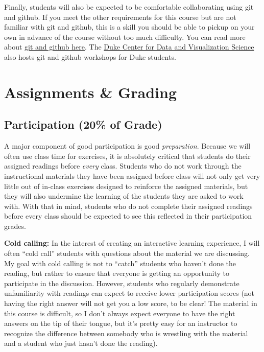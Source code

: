 \documentclass[12pt]{article}
\begin{document}
Finally, students will also be expected to be comfortable collaborating using git and github. If you meet the other requirements for this course but are not familiar with git and github, this is a skill you should be able to pickup on your own in advance of the course without too much difficulty. You can read more about \href{https://www.practicaldatascience.org/html/git_and_github.html}{git and github here}. The \href{https://library.duke.edu/data/}{Duke Center for Data and Visualization Science} also hosts git and github workshops for Duke students.


\section{Assignments \& Grading}

\subsection{Participation (20\% of Grade)}

A major component of good participation is good \emph{preparation}. Because we will often use class time for exercises, it is absolutely critical that students do their assigned readings before \emph{every} class. Students who do not work through the instructional materials they have been assigned before class will not only get very little out of in-class exercises designed to reinforce the assigned materials, but they will also undermine the learning of the students they are asked to work with. With that in mind, students who do not complete their assigned readings before every class should be expected to see this reflected in their participation grades.

\textbf{Cold calling:} In the interest of creating an interactive learning experience, I will often ``cold call'' students with questions about the material we are discussing. My goal with cold calling is not to ``catch'' students who haven't done the reading, but rather to ensure that everyone is getting an opportunity to participate in the discussion. However, students who regularly demonstrate unfamiliarity with readings can expect to receive lower participation scores (not having the right answer will not get you a low score, to be clear! The material in this course is difficult, so I don't always expect everyone to have the right answers on the tip of their tongue, but it's pretty easy for an instructor to recognize the difference between somebody who is wrestling with the material and a student who just hasn't done the reading).
\end{document}
